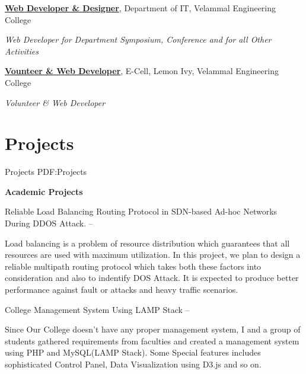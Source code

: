 \documentclass[letterpaper,MMMyyyy,nonstop]{simpleresumecv}
\begin{document}
\begin{body}
\BigGap

\href{\#}
{\textbf{Web Developer \& Designer}},
Department of IT, Velammal Engineering College

\BulletItem
\emph{Web Developer for Department Symposium, Conference and  for all Other Activities }
\hfill
{}


\BigGap
\href{\#}
{\textbf{Vounteer \& Web Developer}},
E-Cell, Lemon Ivy, Velammal Engineering College

\GapNoBreak
\BulletItem
\emph{Volunteer \& Web Developer } 
\hfill
{}


\section
{Projects}
{Projects}
{PDF:Projects}

{\textbf{Academic Projects}}

\GapNoBreak
\BulletItem
Reliable Load Balancing Routing Protocol in SDN-based \newline Ad-hoc Networks During DDOS Attack.
\hfill
{} --
\begin{detail}
\SubBulletItem
Load balancing is a problem of resource distribution which guarantees that all resources are used with maximum utilization. 
In this project, we plan to design a reliable multipath routing protocol which takes both these factors into consideration and also to indentify DOS Attack. 
It is expected to produce better performance against fault or attacks and heavy traffic scenarios.
\end{detail}

\newline

\GapNoBreak
\BulletItem
College Management System Using LAMP Stack
\hfill
{} --
\begin{detail}
\SubBulletItem
Since Our College doesn't have any proper management system, I and a group of students gathered requirements from faculties and created a management system using PHP and MySQL(LAMP Stack). Some Special features includes sophisticated Control Panel, Data Visualization using D3.js and so on. 
\end{detail}



\end{body}
\end{document}
